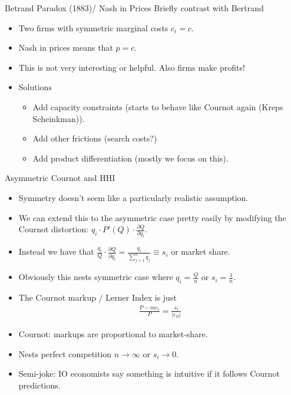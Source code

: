 \documentclass[xcolor=pdftex,dvipsnames,table,mathserif,aspectratio=169]{beamer}
\begin{document}
\begin{frame}{Betrand Paradox (1883)/ Nash in Prices}
Briefly contrast with Bertrand
\begin{itemize}
\item Two firms with symmetric marginal costs $c_i=c$.
\item Nash in prices means that $p = c$.
\item This is not very interesting or helpful.  Also firms make profits!
\item Solutions

\begin{itemize}
\item Add capacity constraints (starts to behave like Cournot again (Kreps Scheinkman)).
\item Add other frictions (search costs?)
\item Add product differentiation (mostly we focus on this).
\end{itemize}
\end{itemize}
\end{frame}


\begin{frame}{Asymmetric Cournot and HHI}
\begin{itemize}
\item Symmetry doesn't seem like a particularly realistic assumption.
\item We can extend this to the asymmetric case pretty easily by modifying the \alert{Cournot distortion}: $q_i \cdot P'(Q) \cdot \frac{\partial Q}{\partial q_i}$.
\item Instead we have that $\frac{q_i}{Q} \cdot \frac{\partial Q}{\partial q_i} = \frac{q_i}{\sum_{j=1}^n q_j} \equiv s_i$ or \alert{market share}.
\item Obviously this nests symmetric case where $q_i = \frac{Q}{n}$ or $s_i = \frac{1}{n}$.
\item The Cournot markup / Lerner Index is just
\begin{eqnarray*}
\frac{P-mc_i}{P} = \frac{s_i}{|\epsilon_D|}
\end{eqnarray*}
\item Cournot: markups are proportional to market-share.
\item Nests perfect competition $n \rightarrow \infty$ or $s_i \rightarrow 0$.
\item Semi-joke: IO economists say something is \alert{intuitive} if it follows Cournot predictions.
\end{itemize}
\end{frame}
\end{document}
